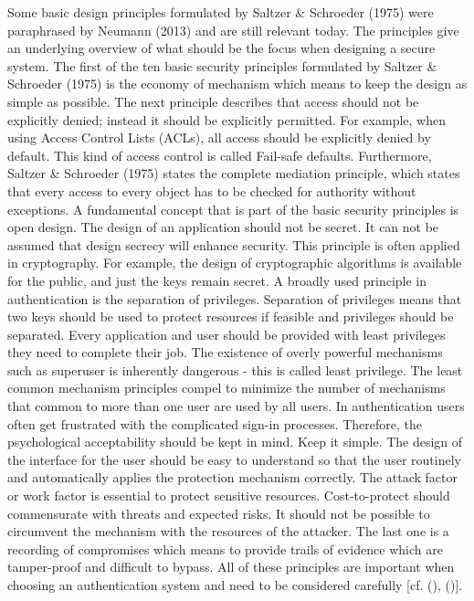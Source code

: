 Some basic design principles formulated by Saltzer \& Schroeder (1975) were paraphrased by Neumann (2013) and are still relevant today. The principles give an underlying overview of what should be the focus when designing a secure system. The first of the ten basic security principles formulated by  Saltzer \& Schroeder (1975) is the economy of mechanism which means to keep the design as simple as possible. The next principle describes that access should not be explicitly denied; instead it should be explicitly permitted. For example, when using Access Control Lists (ACLs), all access should be explicitly denied by default. This kind of access control is called Fail-safe defaults.
Furthermore,  Saltzer \& Schroeder (1975) states the complete mediation principle, which states that every access to every object has to be checked for authority without exceptions. A fundamental concept that is part of the basic security principles is open design. The design of an application should not be secret. It can not be assumed that design secrecy will enhance security. This principle is often applied in cryptography. For example, the design of cryptographic algorithms is available for the public, and just the keys remain secret. A broadly used principle in authentication is the separation of privileges. Separation of privileges means that two keys should be used to protect resources if feasible and privileges should be separated.
Every application and user should be provided with least privileges they need to complete their job. The existence of overly powerful mechanisms such as superuser is inherently dangerous - this is called least privilege. The least common mechanism principles compel to minimize the number of mechanisms that common to more than one user are used by all users. In authentication users often get frustrated with the complicated sign-in processes. Therefore, the psychological acceptability should be kept in mind. Keep it simple. The design of the interface for the user should be easy to understand so that the user routinely and automatically applies the protection mechanism correctly. The attack factor or work factor is essential to protect sensitive resources. Cost-to-protect should commensurate with threats and expected risks. It should not be possible to circumvent the mechanism with the resources of the attacker.   
The last one is a recording of compromises which means to provide trails of evidence which are tamper-proof and difficult to bypass. All of these principles are important when choosing an authentication system and need to be considered carefully [cf. (\cite{Neumann:2018:PTC}), (\cite{Saltzer:PICS})]. 

